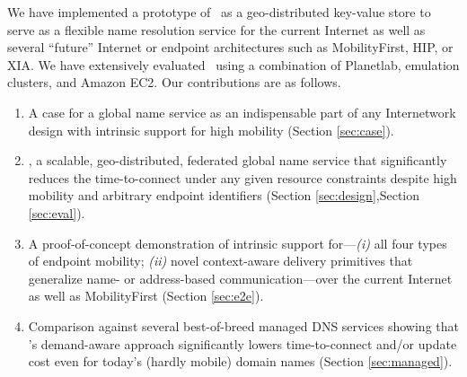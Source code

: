 


We have implemented a prototype of \auspice\ as a geo-distributed key-value store to serve as a flexible name resolution service for the current Internet as well as several ``future'' Internet or endpoint architectures such as MobilityFirst\cite{MobilityFirst}, HIP\cite{HIP}, or XIA\cite{XIA}. We have extensively evaluated \auspice\  using a combination of Planetlab, emulation clusters, and Amazon EC2.  Our contributions are as follows.
\begin{enumerate}
\item A case for a global name service as an indispensable part of any Internetwork design with intrinsic support for high mobility (Section \ref{sec:case}).

\item \auspice, a scalable, geo-distributed, federated global name service that significantly reduces the time-to-connect under any given resource constraints despite high mobility and arbitrary endpoint identifiers (Section \ref{sec:design},Section \ref{sec:eval}). 

\item A proof-of-concept demonstration of intrinsic support for---{\em(i)} all four types of endpoint mobility; {\em(ii)} novel context-aware delivery primitives that generalize name- or address-based communication---over the current Internet as well as MobilityFirst \cite{MobilityFirst} (Section \ref{sec:e2e}). 

\item Comparison against several best-of-breed managed DNS services showing that \auspice's  demand-aware approach significantly lowers time-to-connect and/or update cost even for today's (hardly mobile) domain names (Section \ref{sec:managed}).

\end{enumerate}


